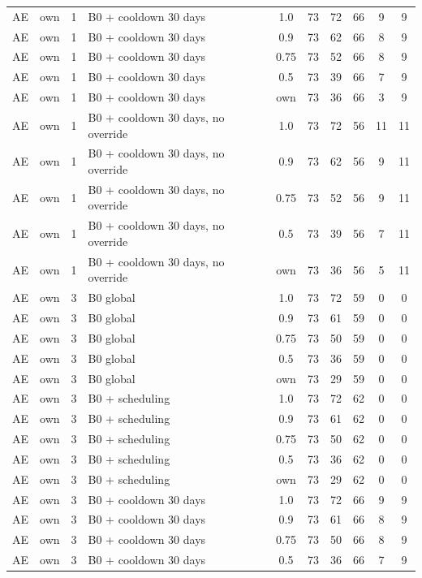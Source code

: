 \documentclass[10pt,onecolumn,letterpaper]{article}
\begin{document}
\begin{longtable}{lllp{4.4cm}cccccc}
AE & own & 1 & B0 + cooldown 30 days & 1.0 & 73 & 72 & 66 & 9 & 9 \\
AE & own & 1 & B0 + cooldown 30 days & 0.9 & 73 & 62 & 66 & 8 & 9 \\
AE & own & 1 & B0 + cooldown 30 days & 0.75 & 73 & 52 & 66 & 8 & 9 \\
AE & own & 1 & B0 + cooldown 30 days & 0.5 & 73 & 39 & 66 & 7 & 9 \\
AE & own & 1 & B0 + cooldown 30 days & own & 73 & 36 & 66 & 3 & 9 \\
AE & own & 1 & B0 + cooldown 30 days, no override & 1.0 & 73 & 72 & 56 & 11 & 11 \\
AE & own & 1 & B0 + cooldown 30 days, no override & 0.9 & 73 & 62 & 56 & 9 & 11 \\
AE & own & 1 & B0 + cooldown 30 days, no override & 0.75 & 73 & 52 & 56 & 9 & 11 \\
AE & own & 1 & B0 + cooldown 30 days, no override & 0.5 & 73 & 39 & 56 & 7 & 11 \\
AE & own & 1 & B0 + cooldown 30 days, no override & own & 73 & 36 & 56 & 5 & 11 \\
AE & own & 3 & B0 global & 1.0 & 73 & 72 & 59 & 0 & 0 \\
AE & own & 3 & B0 global & 0.9 & 73 & 61 & 59 & 0 & 0 \\
AE & own & 3 & B0 global & 0.75 & 73 & 50 & 59 & 0 & 0 \\
AE & own & 3 & B0 global & 0.5 & 73 & 36 & 59 & 0 & 0 \\
AE & own & 3 & B0 global & own & 73 & 29 & 59 & 0 & 0 \\
AE & own & 3 & B0 + scheduling & 1.0 & 73 & 72 & 62 & 0 & 0 \\
AE & own & 3 & B0 + scheduling & 0.9 & 73 & 61 & 62 & 0 & 0 \\
AE & own & 3 & B0 + scheduling & 0.75 & 73 & 50 & 62 & 0 & 0 \\
AE & own & 3 & B0 + scheduling & 0.5 & 73 & 36 & 62 & 0 & 0 \\
AE & own & 3 & B0 + scheduling & own & 73 & 29 & 62 & 0 & 0 \\
AE & own & 3 & B0 + cooldown 30 days & 1.0 & 73 & 72 & 66 & 9 & 9 \\
AE & own & 3 & B0 + cooldown 30 days & 0.9 & 73 & 61 & 66 & 8 & 9 \\
AE & own & 3 & B0 + cooldown 30 days & 0.75 & 73 & 50 & 66 & 8 & 9 \\
AE & own & 3 & B0 + cooldown 30 days & 0.5 & 73 & 36 & 66 & 7 & 9 \\

\end{longtable}
\end{document}
